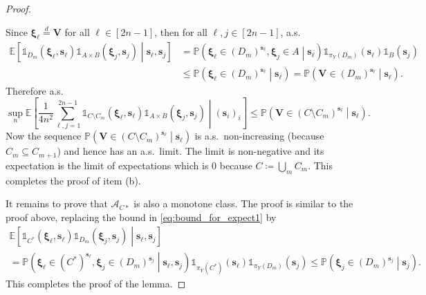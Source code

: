\documentclass[10pt,a4paper]{amsart}
\def\E{\mathbb{E}}
\def\P{\mathbb{P}}
\begin{document}
\begin{proof}
\begin{itemize}
Since  $\bm \xi_\ell\stackrel{d}{=}\bm V$ for all $\ell\in[2n-1]$, then for all $\ell,j\in[2n-1]$, a.s.
\begin{align}
\E\left[\mathds{1}_{D_m}\left(\bm \xi_\ell,\bm s_\ell\right)\mathds{1}_{A\times B}\left(\bm \xi_j,\bm s_j\right)\middle| \bm s_\ell,\bm s_j\right]
&=\P\left(\bm \xi_\ell\in (D_m)^{\bm s_\ell},\bm \xi_j\in A\middle| \bm s_\ell\right)\mathds{1}_{\pi_Y(D_m)}(\bm s_\ell)\mathds{1}_{B}(\bm s_j)\\
&\leq \P\left(\bm \xi_\ell\in (D_m)^{\bm s_\ell}\middle| \bm s_\ell\right)=\P\left(\bm V\in (D_m)^{\bm s_\ell}\middle| \bm s_\ell\right).\label{eq:bound_for_expect1}
\end{align}
Therefore a.s.
\begin{equation}\label{eq:bnd_for_exp}
\sup_{n}\E\left[\frac{1}{4n^2}\sum_{\ell,j=1}^{2n-1}\mathds{1}_{C\setminus C_m}\left(\bm \xi_\ell,\bm s_\ell\right)\mathds{1}_{A\times B}\left(\bm \xi_j,\bm s_j\right)\middle| ( \bm s_i)_i\right]
\leq\P\left(\bm V\in (C\setminus C_m)^{\bm s_\ell}\middle| \bm s_\ell\right).
\end{equation}
Now the sequence $\P\left(\bm V\in (C\setminus C_m)^{\bm s_\ell}\middle| \bm s_\ell\right)$ is a.s.\ non-increasing (because  $C_m \subseteq C_{m+1}$) and hence has an a.s.\ limit. The limit is non-negative and its expectation is the limit of expectations which is $0$ because  $C\coloneqq\bigcup_m C_m$. This completes the proof of item (b).
\end{itemize}


It remains to prove that $\mathcal{A}_{C*}$ is also a monotone class.
The proof is similar to the proof above, replacing the bound in \cref{eq:bound_for_expect1} by
\begin{multline}\label{eq:bound_for_expect2}
\E\left[\mathds{1}_{C^*}\left(\bm \xi_\ell,\bm s_\ell\right)\mathds{1}_{D_m}\left(\bm \xi_j,\bm s_j\right)\middle| \bm s_\ell,\bm s_j\right]\\
=\P\left(\bm \xi_\ell\in (C^*)^{\bm s_\ell},\bm \xi_j\in (D_m)^{\bm s_j}\middle| \bm s_\ell,\bm s_j\right)\mathds{1}_{\pi_Y(C^*)}(\bm s_\ell)\mathds{1}_{\pi_Y(D_m)}(\bm s_j)
\leq \P\left(\bm \xi_j\in (D_m)^{\bm s_j}\middle|\bm s_j\right).
\end{multline}
This completes the proof of the lemma.
\end{proof}
\end{document}
